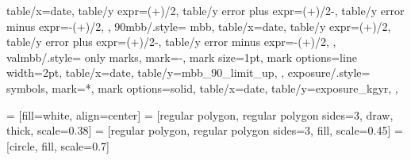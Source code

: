 {{    table/x=date,
    table/y expr={(+)/2},
    table/y error plus expr={(+)/2-},
    table/y error minus expr={-(+)/2},
  },
  90mbb/.style={%
    mbb,
    table/x=date,
    table/y expr={(+)/2},
    table/y error plus expr={(+)/2-},
    table/y error minus expr={-(+)/2},
  },
  valmbb/.style={%
    only marks,
    mark=-,
    mark size=1pt,
    mark options={line width=2pt},
    table/x=date,
    table/y=mbb_90_limit_up,
  },
  exposure/.style={%
    symbols,
    mark=*,
    mark options={solid},
    table/x=date,
    table/y=exposure_kgyr,
  },
}

 = [fill=white, align=center]
 = [regular polygon, regular polygon sides=3, draw, thick, scale=0.38]
 = [regular polygon, regular polygon sides=3, fill, scale=0.45]
 = [circle, fill, scale=0.7]






